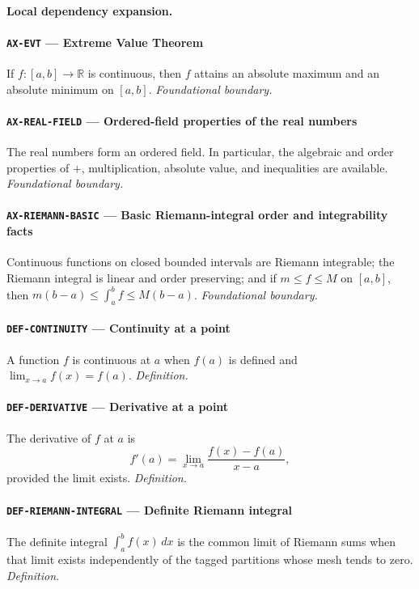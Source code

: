 \documentclass[10pt]{article}
\newcommand{\pidraw}[1]{\begingroup\urlstyle{tt}\nolinkurl{#1}\endgroup}
\theoremstyle{definition}
\theoremstyle{remark}
\begin{document}
\paragraph{Local dependency expansion.}

\paragraph{\pidraw{AX-EVT} --- Extreme Value Theorem}
If $f:[a,b]\to\mathbb{R}$ is continuous, then $f$ attains an absolute maximum and an absolute minimum on $[a,b]$.
\textit{Foundational boundary.}

\paragraph{\pidraw{AX-REAL-FIELD} --- Ordered-field properties of the real numbers}
The real numbers form an ordered field. In particular, the algebraic and order properties of $+$, multiplication, absolute value, and inequalities are available.
\textit{Foundational boundary.}

\paragraph{\pidraw{AX-RIEMANN-BASIC} --- Basic Riemann-integral order and integrability facts}
Continuous functions on closed bounded intervals are Riemann integrable; the Riemann integral is linear and order preserving; and if $m\le f\le M$ on $[a,b]$, then $m(b-a)\le\int_a^b f\le M(b-a)$.
\textit{Foundational boundary.}

\paragraph{\pidraw{DEF-CONTINUITY} --- Continuity at a point}
A function $f$ is continuous at $a$ when $f(a)$ is defined and $\lim_{x\to a}f(x)=f(a)$.
\textit{Definition.}

\paragraph{\pidraw{DEF-DERIVATIVE} --- Derivative at a point}
The derivative of $f$ at $a$ is
\[
f'(a)=\lim_{x\to a}\frac{f(x)-f(a)}{x-a},
\]
provided the limit exists.
\textit{Definition.}

\paragraph{\pidraw{DEF-RIEMANN-INTEGRAL} --- Definite Riemann integral}
The definite integral $\int_a^b f(x)\,dx$ is the common limit of Riemann sums when that limit exists independently of the tagged partitions whose mesh tends to zero.
\textit{Definition.}
\end{document}
